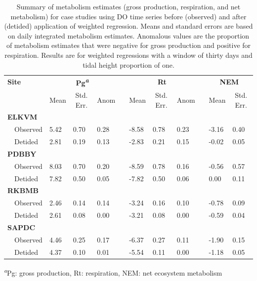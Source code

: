 \documentclass[letterpaper,12pt,oneside]{article}\usepackage[]{graphicx}\usepackage[]{color}
\begin{document}
%
\begin{table}[!tbp]
\caption{Summary of metabolism estimates (gross production, respiration, and net metabolism) for case studies using \ac{DO} time series before (observed) and after (detided) application of weighted regression.  Means and standard errors are based on daily integrated metabolism estimates.  Anomalous values are the proportion of metabolism estimates that were negative for gross production and positive for respiration.  Results are for weighted regressions with a window of thirty days and tidal height proportion of one.\label{tab:case_res}} 
\begin{center}
\begin{tabular}{llllclllcll}
\hline\hline
\multicolumn{1}{l}{\bfseries Site}&\multicolumn{3}{c}{\bfseries Pg\textsuperscript{\textit{a}}}&\multicolumn{1}{c}{\bfseries }&\multicolumn{3}{c}{\bfseries Rt}&\multicolumn{1}{c}{\bfseries }&\multicolumn{2}{c}{\bfseries NEM}\tabularnewline
\cline{2-4} \cline{6-8} \cline{10-11}
\multicolumn{1}{l}{}&\multicolumn{1}{c}{Mean}&\multicolumn{1}{c}{Std. Err.}&\multicolumn{1}{c}{Anom}&\multicolumn{1}{c}{}&\multicolumn{1}{c}{Mean}&\multicolumn{1}{c}{Std. Err.}&\multicolumn{1}{c}{Anom}&\multicolumn{1}{c}{}&\multicolumn{1}{c}{Mean}&\multicolumn{1}{c}{Std. Err.}\tabularnewline
\hline
{\bfseries ELKVM}&&&&&&&&&&\tabularnewline
~~Observed&5.42&0.70&0.28&&-8.58&0.78&0.23&&-3.16&0.40\tabularnewline
~~Detided&2.81&0.19&0.13&&-2.83&0.21&0.15&&-0.02&0.05\tabularnewline
\hline
{\bfseries PDBBY}&&&&&&&&&&\tabularnewline
~~Observed&8.03&0.70&0.20&&-8.59&0.78&0.16&&-0.56&0.57\tabularnewline
~~Detided&7.82&0.50&0.05&&-7.82&0.50&0.06&& 0.00&0.11\tabularnewline
\hline
{\bfseries RKBMB}&&&&&&&&&&\tabularnewline
~~Observed&2.46&0.14&0.14&&-3.24&0.16&0.10&&-0.78&0.09\tabularnewline
~~Detided&2.61&0.08&0.00&&-3.21&0.08&0.00&&-0.59&0.04\tabularnewline
\hline
{\bfseries SAPDC}&&&&&&&&&&\tabularnewline
~~Observed&4.46&0.25&0.17&&-6.37&0.27&0.11&&-1.90&0.15\tabularnewline
~~Detided&4.37&0.10&0.01&&-5.54&0.11&0.00&&-1.18&0.05\tabularnewline
\hline
\end{tabular}
\end{center}
\textsuperscript{\textit{a}}Pg: gross production, Rt: respiration, NEM: net ecosystem metabolism\end{table}
\end{document}
